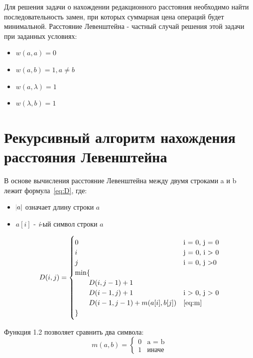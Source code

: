 \documentclass[12pt]{report}
\begin{document}
    Для решения задачи о нахождении редакционного расстояния необходимо найти последовательность замен, при которых
    суммарная цена операций будет минимальной. Расстояние Левенштейна - частный случай решения этой задачи
    при заданных условиях:
    \begin{itemize}
        \item $w(a, a) = 0$
        \item $w(a, b) = 1, a \neq b$
        \item $w(a, \lambda) = 1$
        \item $w(\lambda, b) = 1$
    \end{itemize}


    \section{Рекурсивный алгоритм нахождения расстояния Левенштейна}\label{sec:ReccursiveLev}
    В основе вычисления расстояние Левенштейна между двумя строками a и b лежит формула~\ref{eq:D},
    где:
    \begin{itemize}
        \item $\abs{a}$ означает длину строки $a$
        \item $a[i]$ - \emph{i}-ый символ строки $a$
    \end{itemize}

    \begin{equation}
        \label{eq:D}
        D(i, j) = \begin{cases}
                      0 &\text{i = 0, j = 0} \\
                      i &\text{j = 0, i > 0} \\
                      j &\text{i = 0, j >0} \\
                      \min \lbrace \\
                      \qquad D(i, j - 1) + 1 \\
                      \qquad D(i - 1, j) + 1 &\text{i > 0, j > 0} \\
                      \qquad D(i - 1, j - 1) + m(a[i], b[j]) &\text{\ref{eq:m}} \\
                      \rbrace
        \end{cases}
    \end{equation}

    Функция 1.2 позволяет сравнить два символа:
    \begin{equation}
        \label{eq:m}
        m(a, b) = \begin{cases}
                      0 &\text{a = b} \\
                      1 &\text{иначе}
        \end{cases}
    \end{equation}
\end{document}
